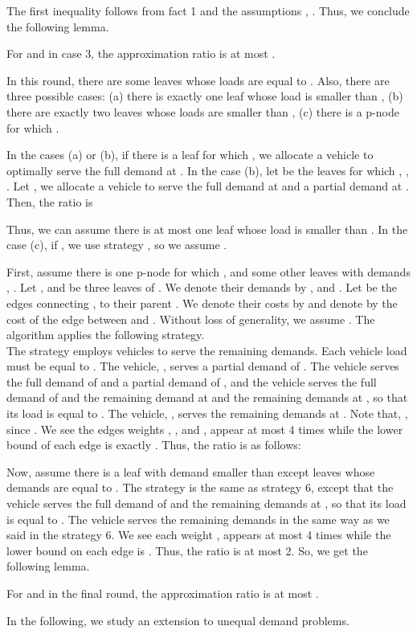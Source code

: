 \noindent The first inequality follows from fact 1 and the assumptions , . Thus, we conclude the following lemma.
\begin{lemma}
For  and in case 3, the approximation ratio is at most .
\end{lemma}

\indent  In this round, there are some leaves whose loads are equal to . Also, there are three possible cases: (a) there is exactly one leaf whose load is smaller than , (b) there are exactly two leaves whose loads are smaller than , (c) there is a p-node  for which .

\indent In the cases (a) or (b), if there is a leaf  for which , we allocate a vehicle to optimally serve the full demand at . In the case (b), let  be the leaves for which , , . Let , we allocate a vehicle to serve the full demand at  and a partial demand at . Then, the ratio is  


\indent Thus, we can assume there is at most one leaf whose load is smaller than . In the case (c), if , we use strategy , so we assume . 

\indent First, assume there is one p-node  for which , and some other leaves  with demands , . Let , and  be three leaves of . We denote their demands by , and . Let  be the edges connecting ,  to their parent . We denote their costs by  and denote by  the cost of the edge between  and . Without loss of generality, we assume . The algorithm applies the following strategy.\\

\indent  The strategy employs  vehicles to serve the remaining demands. Each vehicle load must be equal to . The  vehicle, , serves a partial demand of . The  vehicle serves the full demand of  and a partial demand of , and the  vehicle serves the full demand of  and the remaining demand  at  and the remaining demands at ,  so that its load is equal to . The  vehicle, , serves the remaining demands at . Note that, , since . We see the edges weights , , and , appear at most 4 times while the lower bound of each edge is exactly . Thus, the ratio is as follows:

\indent Now, assume there is a leaf with demand smaller than  except  leaves whose demands are equal to . The strategy is the same as strategy 6, except that the  vehicle serves the full demand of  and the remaining demands at , so that its load is equal to . The  vehicle  serves the remaining demands in the same way as we said in the strategy 6. We see each weight , appears at most 4 times while the lower bound on each edge is . Thus, the ratio is at most 2. So, we get the following lemma.
\begin{lemma}
For  and in the final round, the approximation ratio is at most . 
\end{lemma}
\indent In the following, we study an extension to unequal demand problems.
